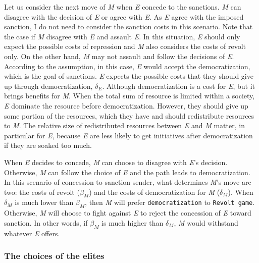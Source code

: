 \documentclass[11pt]{article}
\begin{document}
Let us consider the next move of \textit{M} when \textit{E} concede to the sanctions. \textit{M} can disagree with the decision of \textit{E} or agree with \textit{E}. As \textit{E} agree with the imposed sanction, I do not need to consider the sanction costs in this scenario. Note that the case if \textit{M} disagree with \textit{E} and assault \textit{E}. In this situation, \textit{E} should only expect the possible costs of repression and \textit{M} also considers the costs of revolt only. On the other hand, \textit{M} may not assault and follow the decisions of \textit{E}. According to the assumption, in this case, \textit{E} would accept the democratization, which is the goal of sanctions. \textit{E} expects the possible costs that they should give up through democratization, $\delta_{E}$. Although democratization is a cost for \textit{E}, but it brings benefits for \textit{M}. When the total sum of resource is limited within a society, \textit{E} dominate the resource before democratization. However, they should give up some portion of the resources, which they have and should redistribute resources to \textit{M}. The relative size of redistributed resources between \textit{E} and \textit{M} matter, in particular for \textit{E}, because \textit{E} are less likely to get initiatives after democratization if they are soaked too much. 

When \textit{E} decides to concede, \textit{M} can choose to disagree with \textit{E}'s decision. Otherwise, \textit{M} can follow the choice of \textit{E} and the path leads to democratization. In this scenario of concession to sanction sender, what determines \textit{M}'s move are two: the costs of revolt ($\beta_{M}$) and the costs of democratization for \textit{M} ($\delta_{M}$). When $\delta_{M}$ is much lower than $\beta_{M}$, then \textit{M} will prefer \texttt{democratization} to \texttt{Revolt game}. Otherwise, \textit{M} will choose to fight against \textit{E} to reject the concession of \textit{E} toward sanction. In other words, if $\beta_{M}$ is much higher than $\delta_{M}$, \textit{M} would withstand whatever \textit{E} offers.
	
\subsubsection*{The choices of the elites}
\end{document}
